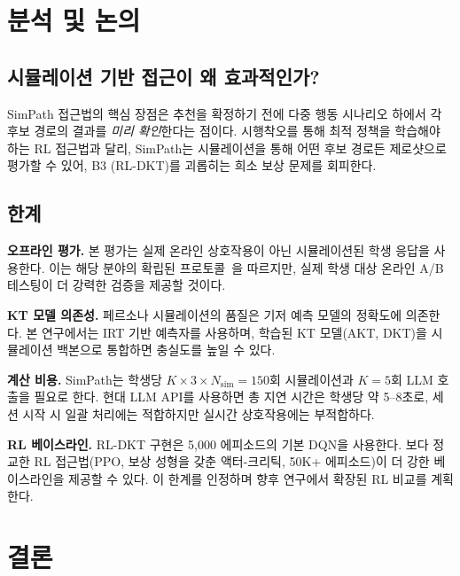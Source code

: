 \documentclass[runningheads]{llncs}
\begin{document}
\section{분석 및 논의}

\subsection{시뮬레이션 기반 접근이 왜 효과적인가?}

SimPath 접근법의 핵심 장점은 추천을 확정하기 전에 다중 행동 시나리오 하에서 각 후보 경로의 결과를 \emph{미리 확인}한다는 점이다.
시행착오를 통해 최적 정책을 학습해야 하는 RL 접근법과 달리, SimPath는 시뮬레이션을 통해 어떤 후보 경로든 제로샷으로 평가할 수 있어, B3 (RL-DKT)를 괴롭히는 희소 보상 문제를 회피한다.

\subsection{한계}

\textbf{오프라인 평가.}
본 평가는 실제 온라인 상호작용이 아닌 시뮬레이션된 학생 응답을 사용한다.
이는 해당 분야의 확립된 프로토콜~\cite{cseal2019,src2023}을 따르지만, 실제 학생 대상 온라인 A/B 테스팅이 더 강력한 검증을 제공할 것이다.

\textbf{KT 모델 의존성.}
페르소나 시뮬레이션의 품질은 기저 예측 모델의 정확도에 의존한다.
본 연구에서는 IRT 기반 예측자를 사용하며, 학습된 KT 모델(AKT, DKT)을 시뮬레이션 백본으로 통합하면 충실도를 높일 수 있다.

\textbf{계산 비용.}
SimPath는 학생당 $K \times 3 \times N_{\text{sim}} = 150$회 시뮬레이션과 $K=5$회 LLM 호출을 필요로 한다.
현대 LLM API를 사용하면 총 지연 시간은 학생당 약 5--8초로, 세션 시작 시 일괄 처리에는 적합하지만 실시간 상호작용에는 부적합하다.

\textbf{RL 베이스라인.}
RL-DKT 구현은 5,000 에피소드의 기본 DQN을 사용한다.
보다 정교한 RL 접근법(PPO, 보상 성형을 갖춘 액터-크리틱, 50K+ 에피소드)이 더 강한 베이스라인을 제공할 수 있다.
이 한계를 인정하며 향후 연구에서 확장된 RL 비교를 계획한다.

\section{결론}
\end{document}
